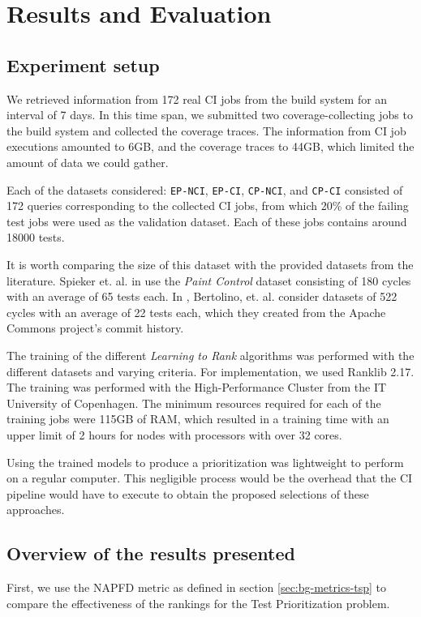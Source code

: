 \chapter{Results and Evaluation}\label{s:results}

\section{Experiment setup}\label{s:results-experimentsetup}

We retrieved information from 172 real CI jobs from the build system for an 
interval of 7 days. In this time span, we submitted two coverage-collecting jobs 
to the build system and collected the coverage traces. The information from CI 
job executions amounted to 6GB, and the coverage traces to 44GB, which limited 
the amount of data we could gather.

Each of the datasets considered: \texttt{EP-NCI}, \texttt{EP-CI}, \texttt{CP-NCI}, and \texttt{CP-CI} 
consisted of 172 queries corresponding to the collected CI jobs, from which 20\% 
of the failing test jobs were used as the validation dataset. Each of these jobs
contains around 18000 tests.

It is worth comparing the size of this dataset with the provided datasets from the literature.
Spieker et. al. in \cite{DBLP:journals/corr/abs-1811-04122} use the \emph{Paint Control} dataset consisting of 180 cycles
with an average of 65 tests each.  In \cite{Bertolino2020LearningtoRankVR}, Bertolino, et. al. consider datasets
of 522 cycles with an average of 22 tests each, which they created from the Apache Commons project's 
commit history.

The training of the different \emph{Learning to Rank} algorithms was performed with the
different datasets and varying criteria. For implementation, we used Ranklib 2.17. The training
was performed with the High-Performance Cluster from the IT University of Copenhagen. The minimum resources 
required for each of the training jobs were 115GB of RAM, which resulted in a training time with an upper limit of 2 hours
for nodes with processors with over 32 cores.

Using the trained models to produce a prioritization was lightweight to perform on
a regular computer. This negligible process would be the overhead that the CI pipeline would have to execute
to obtain the proposed selections of these approaches.

\section{Overview of the results presented}
First, we use the NAPFD metric as defined in section \ref{sec:bg-metrics-tsp} to compare the effectiveness of the 
rankings for the Test Prioritization problem.

